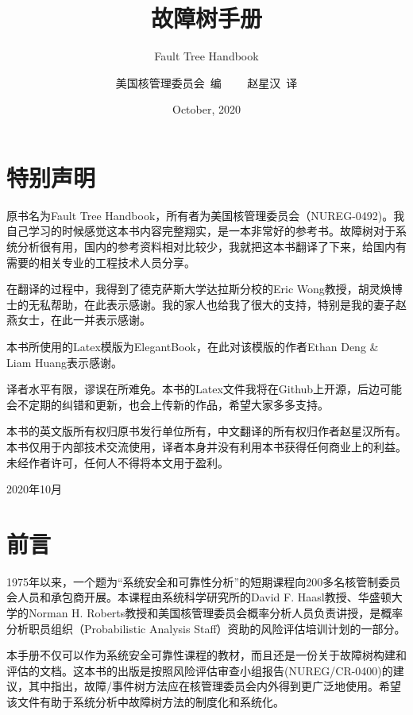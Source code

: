 \documentclass[cn,11pt,chinese]{elegantbook}
\title{故障树手册}
\subtitle{Fault Tree Handbook}
\author{美国核管理委员会\  编 \ \ \ \ 赵星汉\ 译}
\date{October, 2020}
\begin{document}
\maketitle
\frontmatter

\chapter*{特别声明}

原书名为Fault Tree Handbook，所有者为美国核管理委员会（NUREG-0492)。我自己学习的时候感觉这本书内容完整翔实，是一本非常好的参考书。故障树对于系统分析很有用，国内的参考资料相对比较少，我就把这本书翻译了下来，给国内有需要的相关专业的工程技术人员分享。

在翻译的过程中，我得到了德克萨斯大学达拉斯分校的Eric Wong教授，胡灵焕博士的无私帮助，在此表示感谢。我的家人也给我了很大的支持，特别是我的妻子赵燕女士，在此一并表示感谢。

本书所使用的Latex模版为ElegantBook，在此对该模版的作者Ethan Deng \& Liam Huang表示感谢。

译者水平有限，谬误在所难免。本书的Latex文件我将在Github上开源，后边可能会不定期的纠错和更新，也会上传新的作品，希望大家多多支持。

本书的英文版所有权归原书发行单位所有，中文翻译的所有权归作者赵星汉所有。本书仅用于内部技术交流使用，译者本身并没有利用本书获得任何商业上的利益。未经作者许可，任何人不得将本文用于盈利。

\vskip 3.5cm

\begin{flushright}
2020年10月
\end{flushright}

\tableofcontents

\chapter{前言}

1975年以来，一个题为“系统安全和可靠性分析”的短期课程向200多名核管制委员会人员和承包商开展。本课程由系统科学研究所的David F. Haasl教授、华盛顿大学的Norman H. Roberts教授和美国核管理委员会概率分析人员负责讲授，是概率分析职员组织（Probabilistic Analysis Staff）资助的风险评估培训计划的一部分。

本手册不仅可以作为系统安全可靠性课程的教材，而且还是一份关于故障树构建和评估的文档。这本书的出版是按照风险评估审查小组报告(NUREG/CR-0400)的建议，其中指出，故障/事件树方法应在核管理委员会内外得到更广泛地使用。希望该文件有助于系统分析中故障树方法的制度化和系统化。
\end{document}
